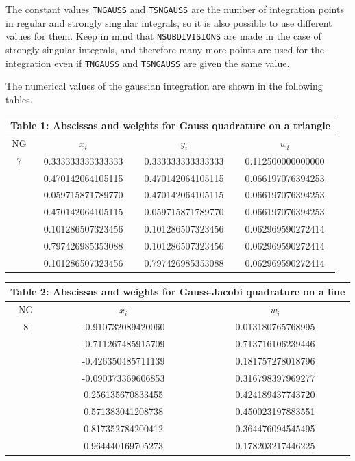 \documentclass[12pt]{article}
\begin{document}
The constant values \verb+TNGAUSS+ and \verb+TSNGAUSS+ are the number of integration points in regular and strongly singular integrals, so it is also possible to use different values for them. Keep in mind that \verb+NSUBDIVISIONS+ are made in the case of strongly singular integrals, and therefore many more points are used for the integration even if \verb+TNGAUSS+ and \verb+TSNGAUSS+ are given the same value.

The numerical values of the gaussian integration are shown in the following tables.

\pagebreak
\begin{center}
\begin{tabular}{|c|c|c|c|}
\multicolumn{4}{c}{Table 1: Abscissas and weights for Gauss quadrature on a triangle}\\
\hline
NG & $x_i$ & $y_i$ & $w_i$\\
\hline\hline
7 & 0.333333333333333 & 0.333333333333333 & 0.112500000000000\\
 & 0.470142064105115 & 0.470142064105115 & 0.066197076394253\\
 & 0.059715871789770 & 0.470142064105115 & 0.066197076394253\\
 & 0.470142064105115 & 0.059715871789770 & 0.066197076394253\\
 & 0.101286507323456 & 0.101286507323456 & 0.062969590272414\\
 & 0.797426985353088 & 0.101286507323456 & 0.062969590272414\\
 & 0.101286507323456 & 0.797426985353088 & 0.062969590272414\\
  \hline
\end{tabular}
\end{center}

\begin{center}
\begin{tabular}{|c|c|c|}
\multicolumn{3}{c}{Table 2: Abscissas and weights for Gauss-Jacobi quadrature on a line}\\
\hline
NG & $x_i$ & $w_i$\\
\hline\hline
8 & -0.910732089420060 & 0.013180765768995\\
 & -0.711267485915709 & 0.713716106239446\\
 & -0.426350485711139 & 0.181757278018796\\
 & -0.090373369606853 & 0.316798397969277\\
 & 0.256135670833455 & 0.424189437743720\\
 & 0.571383041208738 & 0.450023197883551\\
 & 0.817352784200412 & 0.364476094545495\\
 & 0.964440169705273 & 0.178203217446225\\
\hline
\end{tabular}
\end{center}
\end{document}

